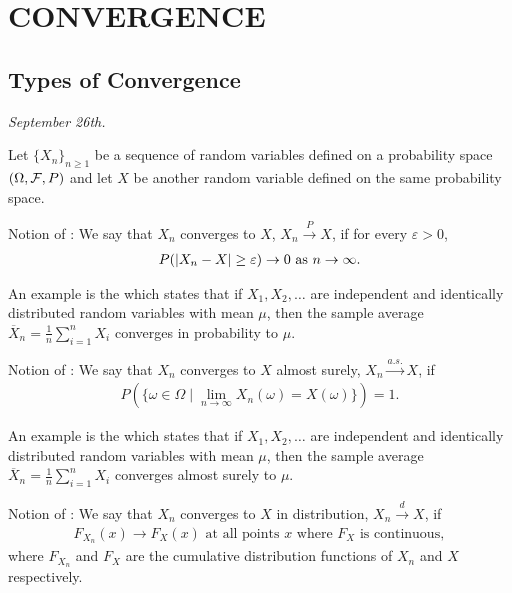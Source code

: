 \chapter{CONVERGENCE}

\section{Types of Convergence}

\textit{September 26th.}

Let $\{X_{n}\}_{n \geq 1}$ be a sequence of random variables defined on a probability space $(\Omega, \mathcal{F}, P)$ and let $X$ be another random variable defined on the same probability space. 

\begin{definition}
    Notion of : We say that $X_{n}$ converges to $X$, $X_{n} \xrightarrow{P} X$, if for every $\varepsilon > 0$,
    \begin{align}
        P(\left| X_{n}-X \right| \geq \varepsilon) \to 0 \text{ as } n \to \infty.
    \end{align}
\end{definition}

An example is the  which states that if $X_{1}, X_{2}, \ldots$ are independent and identically distributed random variables with mean $\mu$, then the sample average $\overline{X}_{n} = \frac{1}{n} \sum_{i=1}^{n} X_{i}$ converges in probability to $\mu$.

\begin{definition}
    Notion of : We say that $X_{n}$ converges to $X$ almost surely, $X_{n} \xrightarrow{a.s.} X$, if 
    \begin{align}
        P\left(\{\omega \in \Omega \mid \lim_{n \to \infty} X_{n}(\omega) = X(\omega)\}\right) = 1.
    \end{align}
\end{definition}

An example is the  which states that if $X_{1}, X_{2}, \ldots$ are independent and identically distributed random variables with mean $\mu$, then the sample average $\overline{X}_{n} = \frac{1}{n} \sum_{i=1}^{n} X_{i}$ converges almost surely to $\mu$.

\begin{definition}
    Notion of : We say that $X_{n}$ converges to $X$ in distribution, $X_{n} \xrightarrow{d} X$, if
    \begin{align}
        F_{X_{n}}(x) \to F_{X}(x) \text{ at all points } x \text{ where } F_{X} \text{ is continuous},
    \end{align}
    where $F_{X_{n}}$ and $F_{X}$ are the cumulative distribution functions of $X_{n}$ and $X$ respectively.
\end{definition}

